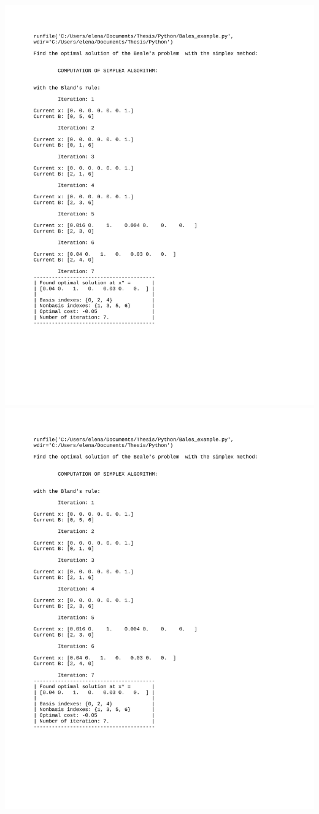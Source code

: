 \documentclass[a4paper,10 pt,titlepage,twoside]{book}
\theoremstyle{plain}
\theoremstyle{definition}
\theoremstyle{remark}
\begin{document}
\includegraphics[page = 1]{Balesexample.pdf}
\includegraphics[page = 2]{Balesexample.pdf}
\end{document}
